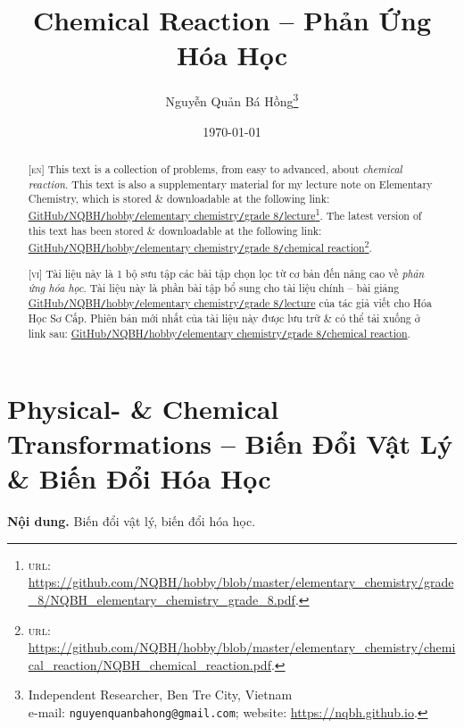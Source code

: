 \documentclass{article}
\title{Chemical Reaction -- Phản Ứng Hóa Học}
\author{Nguyễn Quản Bá Hồng\footnote{Independent Researcher, Ben Tre City, Vietnam\\e-mail: \texttt{nguyenquanbahong@gmail.com}; website: \url{https://nqbh.github.io}.}}
\date{\today}
\begin{document}
\maketitle
\begin{abstract}
	\textsc{[en]} This text is a collection of problems, from easy to advanced, about \textit{chemical reaction}. This text is also a supplementary material for my lecture note on Elementary Chemistry, which is stored \& downloadable at the following link: \href{https://github.com/NQBH/hobby/blob/master/elementary_chemistry/grade_8/NQBH_elementary_chemistry_grade_8.pdf}{GitHub\texttt{/}NQBH\texttt{/}hobby\texttt{/}elementary chemistry\texttt{/}grade 8\texttt{/}lecture}\footnote{\textsc{url}: \url{https://github.com/NQBH/hobby/blob/master/elementary_chemistry/grade_8/NQBH_elementary_chemistry_grade_8.pdf}.}. The latest version of this text has been stored \& downloadable at the following link: \href{https://github.com/NQBH/hobby/blob/master/elementary_chemistry/chemical_reaction/NQBH_chemical_reaction.pdf}{GitHub\texttt{/}NQBH\texttt{/}hobby\texttt{/}elementary chemistry\texttt{/}grade 8\texttt{/}chemical reaction}\footnote{\textsc{url}: \url{https://github.com/NQBH/hobby/blob/master/elementary_chemistry/chemical_reaction/NQBH_chemical_reaction.pdf}.}.
	\vspace{2mm}
	
	\textsc{[vi]} Tài liệu này là 1 bộ sưu tập các bài tập chọn lọc từ cơ bản đến nâng cao về \textit{phản ứng hóa học}. Tài liệu này là phần bài tập bổ sung cho tài liệu chính -- bài giảng \href{https://github.com/NQBH/hobby/blob/master/elementary_chemistry/grade_8/NQBH_elementary_chemistry_grade_8.pdf}{GitHub\texttt{/}NQBH\texttt{/}hobby\texttt{/}elementary chemistry\texttt{/}grade 8\texttt{/}lecture} của tác giả viết cho Hóa Học Sơ Cấp. Phiên bản mới nhất của tài liệu này được lưu trữ \& có thể tải xuống ở link sau: \href{https://github.com/NQBH/hobby/blob/master/elementary_chemistry/grade_8/real/NQBH_real.pdf}{GitHub\texttt{/}NQBH\texttt{/}hobby\texttt{/}elementary chemistry\texttt{/}grade 8\texttt{/}chemical reaction}.
\end{abstract}
\setcounter{secnumdepth}{4}
\setcounter{tocdepth}{3}
\tableofcontents
\newpage


\section{Physical- \& Chemical Transformations -- Biến Đổi Vật Lý \& Biến Đổi Hóa Học}
\textsf{\textbf{Nội dung.} Biến đổi vật lý, biến đổi hóa học.}
\end{document}
